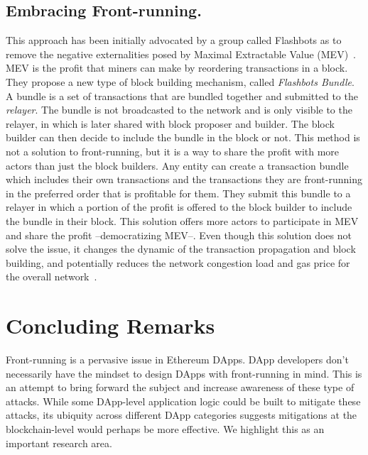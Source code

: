 \subsection{Embracing Front-running.}
This approach has been initially advocated by a group called Flashbots as to remove the negative externalities posed by Maximal Extractable Value (MEV)~\cite{flashbotswebsite}. MEV is the profit that miners can make by reordering transactions in a block. They propose a new type of block building mechanism, called \textit{Flashbots Bundle}. A bundle is a set of transactions that are bundled together and submitted to the \textit{relayer}. The bundle is not broadcasted to the network and is only visible to the relayer, in which is later shared with block proposer and builder. The block builder can then decide to include the bundle in the block or not. This method is not a solution to front-running, but it is a way to share the profit with more actors than just the block builders. Any entity can create a transaction bundle which includes their own transactions and the transactions they are front-running in the preferred order that is profitable for them. They submit this bundle to a relayer in which a portion of the profit is offered to the block builder to include the bundle in their block. This solution offers more actors to participate in MEV and share the profit --democratizing MEV--. Even though this solution does not solve the issue, it changes the dynamic of the transaction propagation and block building, and potentially reduces the network congestion load and gas price for the overall network~\cite{cryptofrens2023}. 







\section{Concluding Remarks}

Front-running is a pervasive issue in Ethereum DApps. DApp developers don't necessarily have the mindset to design DApps with front-running in mind. This is an attempt to bring forward the subject and increase awareness of these type of attacks. While some DApp-level application logic could be built to mitigate these attacks, its ubiquity across different DApp categories suggests mitigations at the blockchain-level would perhaps be more effective. We highlight this as an important research area.


